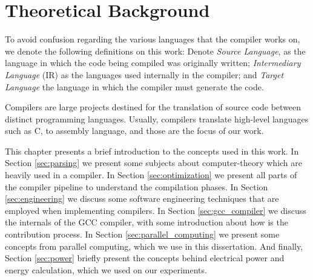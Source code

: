 \chapter{Theoretical Background}
\label{chap:fundamentacao}

To avoid confusion regarding the various languages that the compiler works on,
we denote the following definitions on this work: Denote \textit{Source
Language}, as the language in which the code being compiled was originally
written; \textit{Intermediary Language} (IR) as the languages used internally in the
compiler; and \textit{Target Language} the language in which the compiler must
generate the code.

Compilers are large projects destined for the translation of source code
between distinct programming languages. Usually, compilers translate high-level
languages such as C, to assembly language, and those are the focus of our work.

This chapter presents a brief introduction to the concepts used in this work.
In Section \ref{sec:parsing} we present some subjects about computer-theory
which are heavily used in a compiler. In Section \ref{sec:optimization} we
present all parts of the compiler pipeline to understand the compilation
phases. In Section \ref{sec:engineering} we discuss some software engineering
techniques that are employed when implementing compilers.  In Section
\ref{sec:gcc_compiler} we discuss the internals of the GCC compiler, with some
introduction about how is the contribution process. In Section
\ref{sec:parallel_computing} we present some concepts from parallel computing,
which we use in this dissertation. And finally, Section \ref{sec:power}
briefly present the concepts behind electrical power and energy calculation,
which we used on our experiments.



